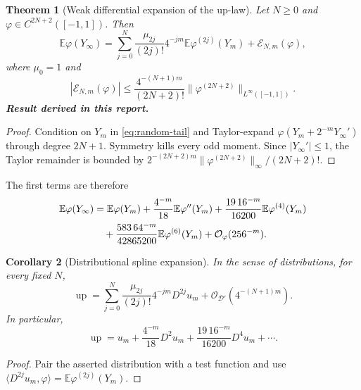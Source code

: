 \documentclass[11pt,oneside]{article}
\numberwithin{equation}{section}
\newtheorem{theorem}{Theorem}[section]
\newtheorem{corollary}[theorem]{Corollary}
\theoremstyle{definition}
\theoremstyle{remark}
\newcommand{\E}{\mathbb E}
\newcommand{\Up}{\operatorname{up}}
\newcommand{\bigO}{\mathcal O}
\newcommand{\newresult}{\textbf{Result derived in this report.}}
\begin{document}
\begin{theorem}[Weak differential expansion of the up-law]
\label{thm:weak-expansion}
Let $N\ge0$ and $\varphi\in C^{2N+2}([-1,1])$.  Then
\begin{equation}
 \boxed{
 \E\varphi(Y_\infty)
 =\sum_{j=0}^{N}\frac{\mu_{2j}}{(2j)!}4^{-jm}
   \E\varphi^{(2j)}(Y_m)+\mathcal E_{N,m}(\varphi),}
 \label{eq:weak-expansion}
\end{equation}
where $\mu_0=1$ and
\begin{equation}
 \boxed{
 |\mathcal E_{N,m}(\varphi)|
 \le\frac{4^{-(N+1)m}}{(2N+2)!}
 \|\varphi^{(2N+2)}\|_{L^\infty([-1,1])}.}
 \label{eq:weak-bound}
\end{equation}
\newresult
\end{theorem}

\begin{proof}
Condition on $Y_m$ in \eqref{eq:random-tail} and Taylor-expand
$\varphi(Y_m+2^{-m}Y_\infty')$ through degree $2N+1$.  Symmetry kills every odd moment.
Since $|Y_\infty'|\le1$, the Taylor remainder is bounded by
$2^{-(2N+2)m}\|\varphi^{(2N+2)}\|_\infty/(2N+2)!$.
\end{proof}

The first terms are therefore
\begin{align}
 \E\varphi(Y_\infty)
 &=\E\varphi(Y_m)
 +\frac{4^{-m}}{18}\E\varphi''(Y_m)
 +\frac{19\,16^{-m}}{16200}\E\varphi^{(4)}(Y_m)
 \notag\\
 &\quad
 +\frac{583\,64^{-m}}{42865200}\E\varphi^{(6)}(Y_m)
 +\bigO_\varphi(256^{-m}).
 \label{eq:weak-first}
\end{align}

\begin{corollary}[Distributional spline expansion]
\label{cor:distributional}
In the sense of distributions, for every fixed $N$,
\begin{equation}
 \Up
 =\sum_{j=0}^{N}\frac{\mu_{2j}}{(2j)!}4^{-jm}D^{2j}u_m
 +\bigO_{\mathcal D'}(4^{-(N+1)m}).
 \label{eq:distributional}
\end{equation}
In particular,
\begin{equation}
 \Up=u_m+\frac{4^{-m}}{18}D^2u_m
 +\frac{19\,16^{-m}}{16200}D^4u_m+\cdots.
 \label{eq:distributional-first}
\end{equation}
\end{corollary}

\begin{proof}
Pair the asserted distribution with a test function and use
$\langle D^{2j}u_m,\varphi\rangle=\E\varphi^{(2j)}(Y_m)$.
\end{proof}
\end{document}
